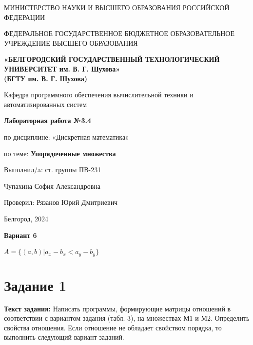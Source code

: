 \documentclass[12pt]{article}
\begin{document}
	\begin{center}
		{\parskip=1cm
			МИНИСТЕРСТВО НАУКИ И ВЫСШЕГО ОБРАЗОВАНИЯ РОССИЙСКОЙ ФЕДЕРАЦИИ
			
			ФЕДЕРАЛЬНОЕ ГОСУДАРСТВЕННОЕ БЮДЖЕТНОЕ ОБРАЗОВАТЕЛЬНОЕ УЧРЕЖДЕНИЕ ВЫСШЕГО ОБРАЗОВАНИЯ
			
			{\bf«БЕЛГОРОДСКИЙ ГОСУДАРСТВЕННЫЙ ТЕХНОЛОГИЧЕСКИЙ УНИВЕРСИТЕТ им. В. Г. Шухова»\\(БГТУ им. В. Г. Шухова)}
			
			\begin{figure}[bh]
				\noindent{}
			\end{figure}
			Кафедра программного обеспечения вычислительной техники и автоматизированных систем
		}
		
		{\Large 
			\vspace{1cm}
			{\parskip=0.25cm 
				{\bf Лабораторная работа №3.4}
				
				по дисциплине: «Дискретная математика»
				
				по теме: {\bf Упорядоченные множества }
			}
		}
	\end{center}	
	\begin{flushleft}
		{\leftskip=10cm
			{\vspace{3cm} Выполнил/a: ст. группы ПВ-231}
			
			Чупахина София Александровна
			
			Проверил: Рязанов Юрий Дмитриевич
			
		}
	\end{flushleft}
	\begin{center}
		{\parskip=3cm Белгород, 2024}
	\end{center}
	\newpage

	{\Large \bf Вариант 6}
	 
	$A=\{(a, b) \Big| a_x - b_x < a_y - b_y\} $
	
	\tableofcontents
	\newpage
	
	\section{Задание 1}
	\label{task1}
	{\bf Текст задания:} Написать программы, формирующие матрицы отношений в соответствии с вариантом задания (табл. 3), на множествах $М1$ и $М2$. Определить свойства отношения. Если отношение не обладает свойством порядка, то выполнить следующий вариант заданий.
	
\end{document}

